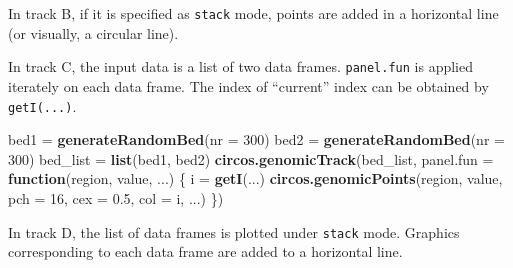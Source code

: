 \documentclass[]{book}
\newenvironment{Shaded}{\begin{snugshade}}{\end{snugshade}}
\newcommand{\KeywordTok}[1]{\textcolor[rgb]{0.13,0.29,0.53}{\textbf{#1}}}
\newcommand{\DataTypeTok}[1]{\textcolor[rgb]{0.13,0.29,0.53}{#1}}
\newcommand{\DecValTok}[1]{\textcolor[rgb]{0.00,0.00,0.81}{#1}}
\newcommand{\FloatTok}[1]{\textcolor[rgb]{0.00,0.00,0.81}{#1}}
\newcommand{\StringTok}[1]{\textcolor[rgb]{0.31,0.60,0.02}{#1}}
\newcommand{\OtherTok}[1]{\textcolor[rgb]{0.56,0.35,0.01}{#1}}
\newcommand{\ControlFlowTok}[1]{\textcolor[rgb]{0.13,0.29,0.53}{\textbf{#1}}}
\newcommand{\OperatorTok}[1]{\textcolor[rgb]{0.81,0.36,0.00}{\textbf{#1}}}
\newcommand{\NormalTok}[1]{#1}
\begin{document}
In track B, if it is specified as \texttt{stack} mode, points are added
in a horizontal line (or visually, a circular line).

\begin{Shaded}
\end{Shaded}

In track C, the input data is a list of two data frames.
\texttt{panel.fun} is applied iterately on each data frame. The index of
``current'' index can be obtained by \texttt{getI(...)}.

\begin{Shaded}
\begin{Highlighting}[]
\NormalTok{bed1 =}\StringTok{ }\KeywordTok{generateRandomBed}\NormalTok{(}\DataTypeTok{nr =} \DecValTok{300}\NormalTok{)}
\NormalTok{bed2 =}\StringTok{ }\KeywordTok{generateRandomBed}\NormalTok{(}\DataTypeTok{nr =} \DecValTok{300}\NormalTok{)}
\NormalTok{bed_list =}\StringTok{ }\KeywordTok{list}\NormalTok{(bed1, bed2)}
\KeywordTok{circos.genomicTrack}\NormalTok{(bed_list, }
    \DataTypeTok{panel.fun =} \ControlFlowTok{function}\NormalTok{(region, value, ...) \{}
\NormalTok{        i =}\StringTok{ }\KeywordTok{getI}\NormalTok{(...)}
        \KeywordTok{circos.genomicPoints}\NormalTok{(region, value, }\DataTypeTok{pch =} \DecValTok{16}\NormalTok{, }\DataTypeTok{cex =} \FloatTok{0.5}\NormalTok{, }\DataTypeTok{col =}\NormalTok{ i, ...)}
\NormalTok{\})}
\end{Highlighting}
\end{Shaded}

In track D, the list of data frames is plotted under \texttt{stack}
mode. Graphics corresponding to each data frame are added to a
horizontal line.
\end{document}
